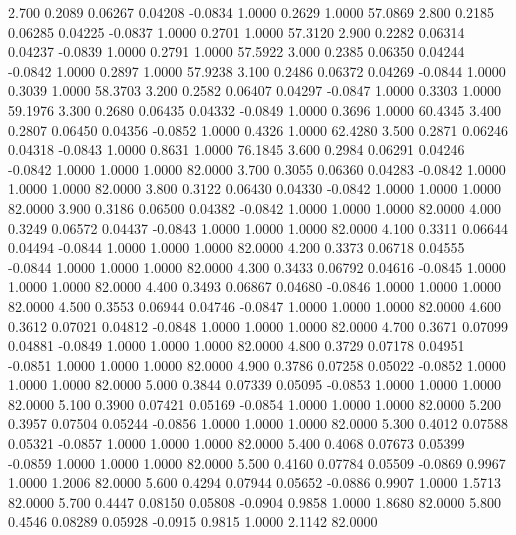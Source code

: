    2.700   0.2089   0.06267   0.04208  -0.0834   1.0000   0.2629   1.0000  57.0869
   2.800   0.2185   0.06285   0.04225  -0.0837   1.0000   0.2701   1.0000  57.3120
   2.900   0.2282   0.06314   0.04237  -0.0839   1.0000   0.2791   1.0000  57.5922
   3.000   0.2385   0.06350   0.04244  -0.0842   1.0000   0.2897   1.0000  57.9238
   3.100   0.2486   0.06372   0.04269  -0.0844   1.0000   0.3039   1.0000  58.3703
   3.200   0.2582   0.06407   0.04297  -0.0847   1.0000   0.3303   1.0000  59.1976
   3.300   0.2680   0.06435   0.04332  -0.0849   1.0000   0.3696   1.0000  60.4345
   3.400   0.2807   0.06450   0.04356  -0.0852   1.0000   0.4326   1.0000  62.4280
   3.500   0.2871   0.06246   0.04318  -0.0843   1.0000   0.8631   1.0000  76.1845
   3.600   0.2984   0.06291   0.04246  -0.0842   1.0000   1.0000   1.0000  82.0000
   3.700   0.3055   0.06360   0.04283  -0.0842   1.0000   1.0000   1.0000  82.0000
   3.800   0.3122   0.06430   0.04330  -0.0842   1.0000   1.0000   1.0000  82.0000
   3.900   0.3186   0.06500   0.04382  -0.0842   1.0000   1.0000   1.0000  82.0000
   4.000   0.3249   0.06572   0.04437  -0.0843   1.0000   1.0000   1.0000  82.0000
   4.100   0.3311   0.06644   0.04494  -0.0844   1.0000   1.0000   1.0000  82.0000
   4.200   0.3373   0.06718   0.04555  -0.0844   1.0000   1.0000   1.0000  82.0000
   4.300   0.3433   0.06792   0.04616  -0.0845   1.0000   1.0000   1.0000  82.0000
   4.400   0.3493   0.06867   0.04680  -0.0846   1.0000   1.0000   1.0000  82.0000
   4.500   0.3553   0.06944   0.04746  -0.0847   1.0000   1.0000   1.0000  82.0000
   4.600   0.3612   0.07021   0.04812  -0.0848   1.0000   1.0000   1.0000  82.0000
   4.700   0.3671   0.07099   0.04881  -0.0849   1.0000   1.0000   1.0000  82.0000
   4.800   0.3729   0.07178   0.04951  -0.0851   1.0000   1.0000   1.0000  82.0000
   4.900   0.3786   0.07258   0.05022  -0.0852   1.0000   1.0000   1.0000  82.0000
   5.000   0.3844   0.07339   0.05095  -0.0853   1.0000   1.0000   1.0000  82.0000
   5.100   0.3900   0.07421   0.05169  -0.0854   1.0000   1.0000   1.0000  82.0000
   5.200   0.3957   0.07504   0.05244  -0.0856   1.0000   1.0000   1.0000  82.0000
   5.300   0.4012   0.07588   0.05321  -0.0857   1.0000   1.0000   1.0000  82.0000
   5.400   0.4068   0.07673   0.05399  -0.0859   1.0000   1.0000   1.0000  82.0000
   5.500   0.4160   0.07784   0.05509  -0.0869   0.9967   1.0000   1.2006  82.0000
   5.600   0.4294   0.07944   0.05652  -0.0886   0.9907   1.0000   1.5713  82.0000
   5.700   0.4447   0.08150   0.05808  -0.0904   0.9858   1.0000   1.8680  82.0000
   5.800   0.4546   0.08289   0.05928  -0.0915   0.9815   1.0000   2.1142  82.0000

